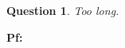 \documentclass{article}
\newtheorem{question}{Question}
\DeclarePairedDelimiter{\paran}{(}{)}%
\begin{document}

\begin{question}\label{q7}
    Too long.
\end{question}

\textbf{Pf:}
\end{document}
